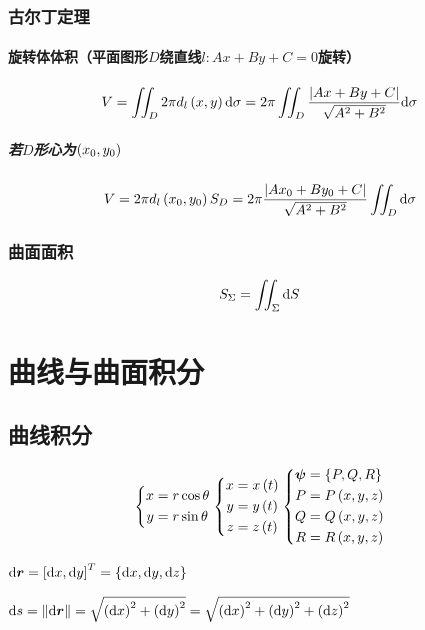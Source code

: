 \documentclass{article}
\begin{document}
\subsubsection{古尔丁定理}

\paragraph{旋转体体积（平面图形$D$绕直线$l:Ax+By+C=0$旋转）}

\[V=\iint_D2\pi d_l\left(x,y\right)\mathrm d\sigma=2\pi\iint_D\frac{\left|Ax+By+C\right|}{\sqrt{A^2+B^2}}\mathrm d\sigma\]

\subparagraph{若$D$形心为$\left(x_0,y_0\right)$}

\[V=2\pi d_l\left(x_0,y_0\right)S_D=2\pi\frac{\left|Ax_0+By_0+C\right|}{\sqrt{A^2+B^2}}\iint_D\mathrm d\sigma\]

\subsubsection{曲面面积}

\[S_\Sigma=\iint_\Sigma\mathrm d S\]

\section{曲线与曲面积分}

\subsection{曲线积分}

\[\left\{\begin{aligned}
        x & =r\cos\theta \\
        y & =r\sin\theta
    \end{aligned}\right.
    \left\{\begin{aligned}
        x & =x\left(t\right) \\
        y & =y\left(t\right) \\
        z & =z\left(t\right)
    \end{aligned}\right.
    \left\{\begin{aligned}
        \boldsymbol\psi & =\left\{P,Q,R\right\}   \\
        P     & =P\left(x,y,z\right) \\
        Q     & =Q\left(x,y,z\right) \\
        R     & =R\left(x,y,z\right)
    \end{aligned}\right.\]

$\mathrm d\boldsymbol r=\left[\mathrm d x,\mathrm d y\right]^T=\left\{\mathrm d x,\mathrm d y,\mathrm d z\right\}$

$\mathrm d s=\left\Vert\mathrm d\boldsymbol r\right\Vert=\sqrt{\left(\mathrm d x\right)^2+\left(\mathrm d y\right)^2}=\sqrt{\left(\mathrm d x\right)^2+\left(\mathrm d y\right)^2+\left(\mathrm d z\right)^2}$
\end{document}
